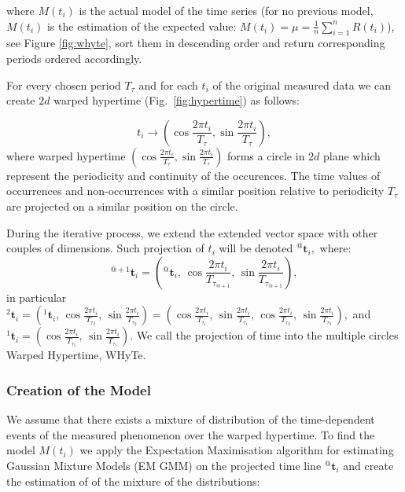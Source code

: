 \noindent where $M\left(t_{i}\right)$ is the actual model of the time series (for no previous model, $M\left(t_{i}\right)$ is the estimation of the expected value: $M\left(t_{i}\right) = \mu = \frac{1}{n} \sum_{i = 1}^{n} R\left(t_{i}\right)$), see Figure \ref{fig:whyte}, sort them in descending order and return corresponding periods ordered accordingly.

For every chosen period $T_{\tau}$ and for each $t_i$ of the original measured data we can create $2d$ warped hypertime (Fig.~\ref{fig:hypertime}) as follows:

\begin{equation}
t_i \rightarrow \left(\cos{\frac{2\pi t_{i}}{T_{\tau}}}, \sin{\frac{2\pi t_{i}}{T_{\tau}}}\right),
\end{equation}
%
where warped hypertime $\left(\cos{\frac{2\pi t_{i}}{T_{\tau}}}, \sin{\frac{2\pi t_{i}}{T_{\tau}}}\right)$ forms a circle in $2d$ plane which represent the periodicity and continuity of the occurences.
The time values of occurrences and non-occurrences with a similar position relative to periodicity $T_{\tau}$ are projected on a similar position on the circle.

During the iterative process, we extend the extended vector space with other couples of dimensions.
Such projection of $t_i$ will be denoted ${}^{@}\mathbf{t}_{i},$ where:
%
\begin{equation}\label{eqn:extension}
    {}^{@+1}\mathbf{t}_{i} = \left({}^{@}\mathbf{t}_{i}, \,\cos{\frac{2\pi t_{i}}{T_{\tau_{@+1}}}}, \, \sin{\frac{2\pi t_{i}}{T_{\tau_{@+1}}}}\right),
\end{equation}
%
in particular ${}^{2}\mathbf{t}_{i} =\left({}^{1}\mathbf{t}_{i}, \,\cos{\frac{2\pi t_{i}}{T_{\tau_2}}}, \, \sin{\frac{2\pi t_{i}}{T_{\tau_2}}}\right) =  \left(\cos{\frac{2\pi t_{i}}{T_{\tau_1}}}, \, \sin{\frac{2\pi t_{i}}{T_{\tau_1}}}, \,\cos{\frac{2\pi t_{i}}{T_{\tau_2}}}, \, \sin{\frac{2\pi t_{i}}{T_{\tau_2}}}\right),$ and
${}^{1}\mathbf{t}_{i} = \left(\cos{\frac{2\pi t_{i}}{T_{\tau_1}}}, \, \sin{\frac{2\pi t_{i}}{T_{\tau_1}}}\right)$.
We call the projection of time into the multiple circles Warped Hypertime, WHyTe.




\subsubsection{Creation of the Model}\label{sec:modelWhyte}

We assume that there exists a mixture of distribution of the time-dependent events of the measured phenomenon over the warped hypertime.
To find the model $M(t_{i})$ we apply the Expectation Maximisation algorithm for estimating Gaussian Mixture Models (EM GMM) on the projected time line ${}^{@}\mathbf{t}_{i}$ and create the estimation of of the mixture of the distributions:

